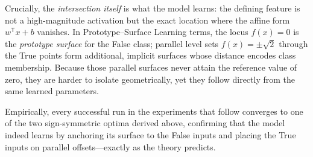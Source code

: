 Crucially, the \emph{intersection itself} is what the model learns:  
the defining feature is not a high-magnitude activation but the exact location
where the affine form \(w^{\mathsf T}x+b\) vanishes.
In Prototype–Surface Learning terms, the locus \(f(x)=0\) is the
\emph{prototype surface} for the False class; parallel level sets
\(f(x)=\pm\sqrt2\) through the True points form additional, implicit
surfaces whose distance encodes class membership.
Because those parallel surfaces never attain the reference value of zero,
they are harder to isolate geometrically, yet they follow directly from the
same learned parameters.

Empirically, every successful run in the experiments that follow converges to
one of the two sign-symmetric optima derived above, confirming that the model
indeed learns by anchoring its surface to the False inputs and placing the
True inputs on parallel offsets—exactly as the theory predicts.
